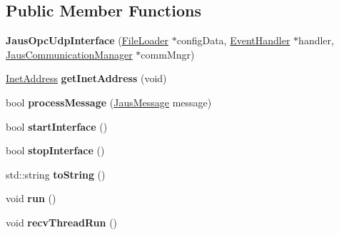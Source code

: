 \subsection*{\-Public \-Member \-Functions}
\begin{DoxyCompactItemize}
\item 
\hypertarget{class_jaus_opc_udp_interface_a040dbf762e23be5d54a4b1ba5a98ced5}{{\bfseries \-Jaus\-Opc\-Udp\-Interface} (\hyperlink{class_file_loader}{\-File\-Loader} $\ast$config\-Data, \hyperlink{class_event_handler}{\-Event\-Handler} $\ast$handler, \hyperlink{class_jaus_communication_manager}{\-Jaus\-Communication\-Manager} $\ast$comm\-Mngr)}\label{class_jaus_opc_udp_interface_a040dbf762e23be5d54a4b1ba5a98ced5}

\item 
\hypertarget{class_jaus_opc_udp_interface_a4312dce593f3aa2ecbd023b637898187}{\hyperlink{struct_inet_address_struct}{\-Inet\-Address} {\bfseries get\-Inet\-Address} (void)}\label{class_jaus_opc_udp_interface_a4312dce593f3aa2ecbd023b637898187}

\item 
\hypertarget{class_jaus_opc_udp_interface_ae612898e3ed44a04fba85f02de1ed456}{bool {\bfseries process\-Message} (\hyperlink{struct_jaus_message_struct}{\-Jaus\-Message} message)}\label{class_jaus_opc_udp_interface_ae612898e3ed44a04fba85f02de1ed456}

\item 
\hypertarget{class_jaus_opc_udp_interface_a040ce061735deb0d0a59951119e7e24b}{bool {\bfseries start\-Interface} ()}\label{class_jaus_opc_udp_interface_a040ce061735deb0d0a59951119e7e24b}

\item 
\hypertarget{class_jaus_opc_udp_interface_a123c24f0a44e5f56268fe0e0cf350156}{bool {\bfseries stop\-Interface} ()}\label{class_jaus_opc_udp_interface_a123c24f0a44e5f56268fe0e0cf350156}

\item 
\hypertarget{class_jaus_opc_udp_interface_a4fdedd3e2c71049c89d438cf81649892}{std\-::string {\bfseries to\-String} ()}\label{class_jaus_opc_udp_interface_a4fdedd3e2c71049c89d438cf81649892}

\item 
\hypertarget{class_jaus_opc_udp_interface_a7f402ba81606b388200903c5be5d8a63}{void {\bfseries run} ()}\label{class_jaus_opc_udp_interface_a7f402ba81606b388200903c5be5d8a63}

\item 
\hypertarget{class_jaus_opc_udp_interface_af94cd473cfaed90ed72ade59db8d02ca}{void {\bfseries recv\-Thread\-Run} ()}\label{class_jaus_opc_udp_interface_af94cd473cfaed90ed72ade59db8d02ca}

\end{DoxyCompactItemize}

